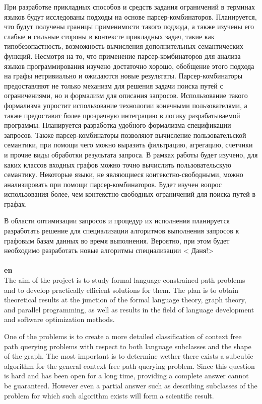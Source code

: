 \documentclass[12pt]{article}  %
\theoremstyle{remark}
\begin{document}
При разработке прикладных способов и средств задания ограничений в терминах языков будут исследованы подходы на основе парсер-комбинаторов.
Планируется, что будут получены границы применимости такого подхода, а также изучены его слабые и сильные стороны в контексте прикладных задач, такие как типобезопастность, возможность вычисления дополнительных семантических функций.
Несмотря на то, что применение парсер-комбинаторов для анализа языков программирования изучено достаточно хорошо, обобщение этого подхода на графы нетривиально и ожидаются новые результаты.
Парсер-комбинаторы предоставляют не только механизм для решения задачи поиска путей с ограничениями, но и формализм для описания запросов.
Использование такого формализма упростит использование технологии конечными пользователями, а также предоставит более прозрачную интеграцию в логику разрабатываемой программы.
Планируется разработка удобного формализма спецификации запросов.
Также парсер-комбинаторы позволяют вычисление пользовательской семантики, при помощи чего можно выразить фильтрацию, агрегацию, счетчики и прочие виды обработки результата запроса.
В рамках работы будет изучено, для каких классов входных графов можно точно вычислить пользовательскую семантику.
Некоторые языки, не являющиеся контекстно-свободными, можно анализировать при помощи парсер-комбинаторов.
Будет изучен вопрос использования более, чем контекстно-свободных ограничений для поиска путей в графах.

В области оптимизации запросов и процедур их исполнения планируется разработать решение для специализации алгоритмов выполнения запросов к графовым базам данных во время выполнения. Вероятно, при этом будет необходимо разработать новые алгоритмы специализации
{\huge< Даня!>}
\\
\\
\textbf{en}\\

The aim of the project is to study formal language constrained path problems and to develop practically efficient solutions for them.
The plan is to obtain theoretical results at the junction of the formal language theory, graph theory, and parallel programming, as well as results in the field of language development and software optimization methods.

One of the problems is to create a more detailed classification of context free path querying problems with respect to both language subclasses and the shape of the graph.
The most important is to determine wether there exists a subcubic algorithm for the general context free path querying problem.
Since this question is hard and has been open for a long time, providing a complete answer cannot be guaranteed.
However even a partial answer such as describing subclasses of the problem for which such algorithm exists will form a scientific result.
\end{document}
